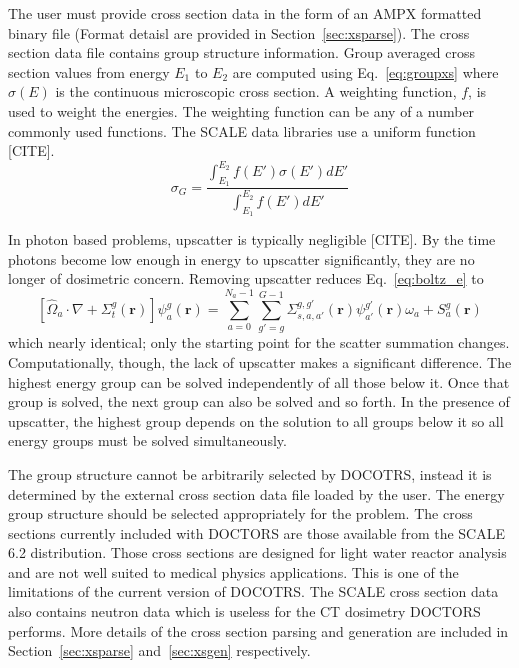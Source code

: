 The user must provide cross section data in the form of an AMPX formatted binary file (Format detaisl are provided in Section~\ref{sec:xsparse}). The cross section data file contains group structure information. Group averaged cross section values from energy $E_1$ to $E_2$ are computed using Eq.~\ref{eq:groupxs} where $\sigma(E)$ is the continuous microscopic cross section. A weighting function, $f$, is used to weight the energies. The weighting function can be any of a number commonly used functions. The SCALE data libraries use a uniform function [CITE].
\begin{equation}\label{eq:groupxs}
\sigma_G = \frac{\int_{E_1}^{E_2}f(E')\sigma(E') dE'}{\int_{E_1}^{E_2} f(E') dE'}
\end{equation}

In photon based problems, upscatter is typically negligible [CITE]. By the time photons become low enough in energy to upscatter significantly, they are no longer of dosimetric concern. Removing upscatter reduces Eq.~\ref{eq:boltz_e} to
\begin{equation} \label{eq:boltz_e2}
\left[ \hat{\Omega}_a \cdot \nabla + \Sigma_t^g(\boldsymbol{r}) \right]
\psi_{a}^{g}(\boldsymbol{r}) = 
\sum_{a=0}^{N_a-1} \sum_{g'=g}^{G-1} \Sigma_{s, a, a'}^{g, g'}(\boldsymbol{r}) \psi_{a'}^{g'}(\boldsymbol{r}) \omega_a + S_a^g(\boldsymbol{r})
\end{equation}
which nearly identical; only the starting point for the scatter summation changes. Computationally, though, the lack of upscatter makes a significant difference. The highest energy group can be solved independently of all those below it. Once that group is solved, the next group can also be solved and so forth. In the presence of upscatter, the highest group depends on the solution to all groups below it so all energy groups must be solved simultaneously.

The group structure cannot be arbitrarily selected by DOCOTRS, instead it is determined by the external cross section data file loaded by the user. The energy group structure should be selected appropriately for the problem. The cross sections currently included with DOCTORS are those available from the SCALE 6.2 distribution. Those cross sections are designed for light water reactor analysis and are not well suited to medical physics applications. This is one of the limitations of the current version of DOCOTRS. The SCALE cross section data also contains neutron data which is useless for the CT dosimetry DOCTORS performs. More details of the cross section parsing and generation are included in Section~\ref{sec:xsparse} and~\ref{sec:xsgen} respectively.

